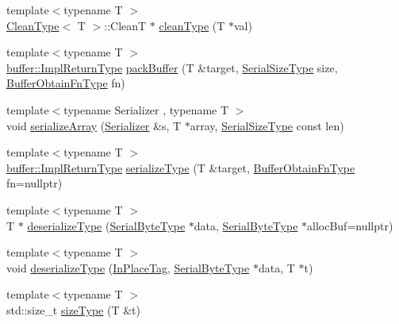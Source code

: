 \begin{DoxyCompactItemize}
\item 
{\footnotesize template$<$typename T $>$ }\\\hyperlink{structcheckpoint_1_1dispatch_1_1_clean_type}{Clean\+Type}$<$ T $>$\+::CleanT $\ast$ \hyperlink{namespacecheckpoint_1_1dispatch_ad92e256ab5d87d2a5a97ed6ed011af9c}{clean\+Type} (T $\ast$val)
\item 
{\footnotesize template$<$typename T $>$ }\\\hyperlink{namespacecheckpoint_1_1buffer_a4e930737a23dabd17333a8ea48c8edff}{buffer\+::\+Impl\+Return\+Type} \hyperlink{namespacecheckpoint_1_1dispatch_aca3c0f09e49b43fb6f3d82fe39e89295}{pack\+Buffer} (T \&target, \hyperlink{namespacecheckpoint_a083f6674da3f94c2901b18c6d238217c}{Serial\+Size\+Type} size, \hyperlink{namespacecheckpoint_a8a2558a1dd0db386339dd81c193b7f10}{Buffer\+Obtain\+Fn\+Type} fn)
\item 
{\footnotesize template$<$typename Serializer , typename T $>$ }\\void \hyperlink{namespacecheckpoint_1_1dispatch_a055fa8c0078dbd129325b1038079d87d}{serialize\+Array} (\hyperlink{structcheckpoint_1_1_serializer}{Serializer} \&s, T $\ast$array, \hyperlink{namespacecheckpoint_a083f6674da3f94c2901b18c6d238217c}{Serial\+Size\+Type} const len)
\item 
{\footnotesize template$<$typename T $>$ }\\\hyperlink{namespacecheckpoint_1_1buffer_a4e930737a23dabd17333a8ea48c8edff}{buffer\+::\+Impl\+Return\+Type} \hyperlink{namespacecheckpoint_1_1dispatch_a721d20cfc6479ca5e029671a56915adc}{serialize\+Type} (T \&target, \hyperlink{namespacecheckpoint_a8a2558a1dd0db386339dd81c193b7f10}{Buffer\+Obtain\+Fn\+Type} fn=nullptr)
\item 
{\footnotesize template$<$typename T $>$ }\\T $\ast$ \hyperlink{namespacecheckpoint_1_1dispatch_aa6898b55f6fb0de0b628567087cc8755}{deserialize\+Type} (\hyperlink{namespacecheckpoint_ae57f01cdc0b81776c23b6c7c934c58f5}{Serial\+Byte\+Type} $\ast$data, \hyperlink{namespacecheckpoint_ae57f01cdc0b81776c23b6c7c934c58f5}{Serial\+Byte\+Type} $\ast$alloc\+Buf=nullptr)
\item 
{\footnotesize template$<$typename T $>$ }\\void \hyperlink{namespacecheckpoint_1_1dispatch_a1830f5dccc7209dc2bbb3b7ac238c36a}{deserialize\+Type} (\hyperlink{structcheckpoint_1_1dispatch_1_1_in_place_tag}{In\+Place\+Tag}, \hyperlink{namespacecheckpoint_ae57f01cdc0b81776c23b6c7c934c58f5}{Serial\+Byte\+Type} $\ast$data, T $\ast$t)
\item 
{\footnotesize template$<$typename T $>$ }\\std\+::size\+\_\+t \hyperlink{namespacecheckpoint_1_1dispatch_a803d1b0d7a7611cb5440688dd12a3ccd}{size\+Type} (T \&t)
\end{DoxyCompactItemize}


